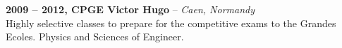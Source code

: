 \documentclass[a4paper,11pt,final]{memoir}
\newcommand{\Sep}{\vspace{1.5em}}
\newcommand{\SmallSep}{\vspace{0.5em}}
\newcommand{\CVItem}[2]
	{\textbf{\color{RoyalBlue} #1 \color{dark_gray} #2}\normalsize\normalfont}
\newcommand{\city}[1]
	{{\small\color{dark_gray}\emph{#1}}\normalsize\normalfont}
\begin{document}
\CVItem{2009 -- 2012,}{CPGE Victor Hugo} -- \city{Caen, Normandy}\\
Highly selective classes to prepare for the competitive exams to the Grandes Ecoles. Physics and Sciences of Engineer.
\Sep

\end{document}
